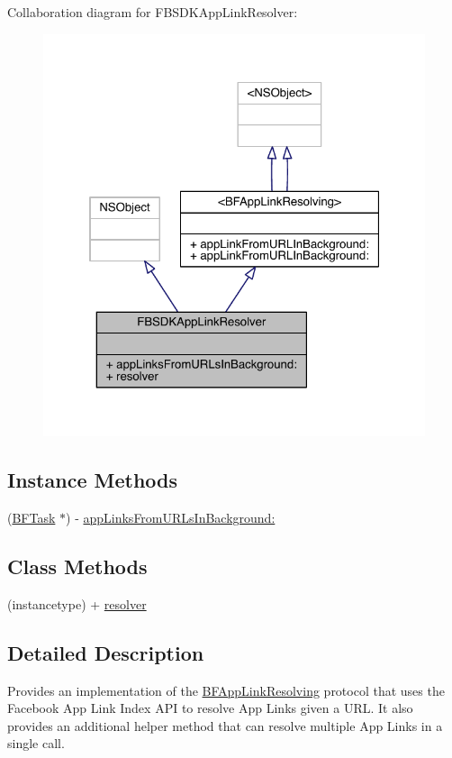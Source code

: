 Collaboration diagram for F\-B\-S\-D\-K\-App\-Link\-Resolver\-:
\nopagebreak
\begin{figure}[H]
\begin{center}
\leavevmode
\includegraphics[width=323pt]{interface_f_b_s_d_k_app_link_resolver__coll__graph}
\end{center}
\end{figure}
\subsection*{Instance Methods}
\begin{DoxyCompactItemize}
\item 
(\hyperlink{interface_b_f_task}{B\-F\-Task} $\ast$) -\/ \hyperlink{interface_f_b_s_d_k_app_link_resolver_a0a56680a0b2be94b85cf45a4db0ebfb5}{app\-Links\-From\-U\-R\-Ls\-In\-Background\-:}
\end{DoxyCompactItemize}
\subsection*{Class Methods}
\begin{DoxyCompactItemize}
\item 
(instancetype) + \hyperlink{interface_f_b_s_d_k_app_link_resolver_a4d9003c46f8f3156deb2c88e82ae2145}{resolver}
\end{DoxyCompactItemize}


\subsection{Detailed Description}
Provides an implementation of the \hyperlink{protocol_b_f_app_link_resolving-p}{B\-F\-App\-Link\-Resolving} protocol that uses the Facebook App Link Index A\-P\-I to resolve App Links given a U\-R\-L. It also provides an additional helper method that can resolve multiple App Links in a single call.

